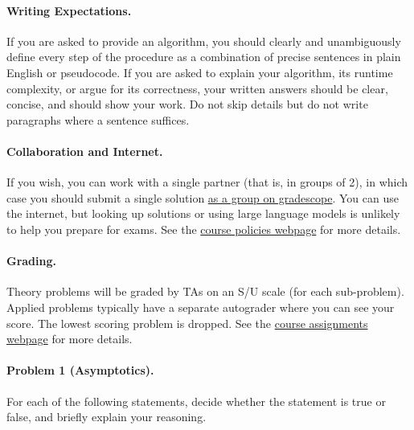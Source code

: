 \documentclass[11pt]{article}
\begin{document}
\paragraph{Writing Expectations.} If you are asked to provide an algorithm, you should clearly and unambiguously define every step of the procedure as a combination of precise sentences in plain English or pseudocode. If you are asked to explain your algorithm, its runtime complexity, or argue for its correctness, your written answers should be clear, concise, and should show your work. Do not skip details but do not write paragraphs where a sentence suffices.

\paragraph{Collaboration and Internet.} If you wish, you can work with a single partner (that is, in groups of 2), in which case you should submit a single solution \href{https://help.gradescope.com/article/m5qz2xsnjy-student-add-group-members}{as a group on gradescope}. You can use the internet, but looking up solutions or using large language models is unlikely to help you prepare for exams. See the \href{https://sites.duke.edu/spring24compsci330/policies/}{course policies webpage} for more details.

\paragraph{Grading.} Theory problems will be graded by TAs on an S/U scale (for each sub-problem). Applied problems typically have a separate autograder where you can see your score. The lowest scoring problem is dropped. See the \href{https://sites.duke.edu/spring24compsci330/assignments/}{course assignments webpage} for more details.




\newpage

\paragraph{Problem 1 (Asymptotics).} 

For each of the following statements, decide whether the statement is true or false, and briefly explain your reasoning.
\end{document}
